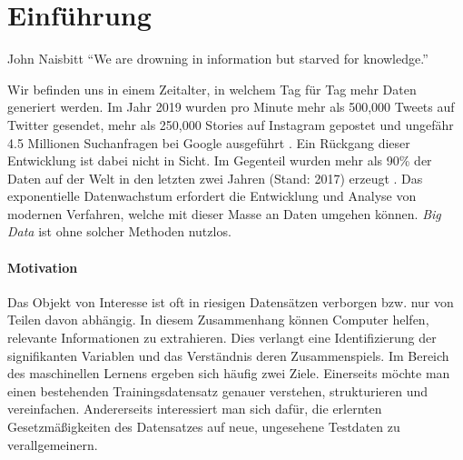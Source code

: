 \chapter{Einführung}

\label{introduction}

\begin{chapquote}{John Naisbitt}
``We are drowning in information but starved for knowledge.''
\end{chapquote}

Wir befinden uns in einem Zeitalter, in welchem Tag für Tag mehr Daten generiert werden. Im Jahr 2019 wurden pro Minute mehr als 500,000 Tweets auf Twitter gesendet, mehr als 250,000 Stories auf Instagram gepostet und ungefähr 4.5 Millionen Suchanfragen bei Google ausgeführt \cite{domo}. Ein Rückgang dieser Entwicklung ist dabei nicht in Sicht. Im Gegenteil wurden mehr als 90\% der Daten auf der Welt in den letzten zwei Jahren (Stand: 2017) erzeugt \cite{ibm}. Das exponentielle Datenwachstum erfordert die Entwicklung und Analyse von modernen Verfahren, welche mit dieser Masse an Daten umgehen können. \textit{Big Data} ist ohne solcher Methoden nutzlos.
 
 


\subsubsection{Motivation}

Das Objekt von Interesse ist oft in riesigen Datensätzen verborgen bzw. nur von Teilen davon abhängig. In diesem Zusammenhang können Computer helfen, relevante Informationen zu extrahieren. Dies verlangt eine Identifizierung der signifikanten Variablen und das Verständnis deren Zusammenspiels. Im Bereich des maschinellen Lernens ergeben sich häufig zwei Ziele. Einerseits möchte man einen bestehenden Trainingsdatensatz genauer verstehen, strukturieren und vereinfachen. Andererseits interessiert man sich dafür, die erlernten Gesetzmäßigkeiten des Datensatzes auf neue, ungesehene Testdaten zu verallgemeinern. 

